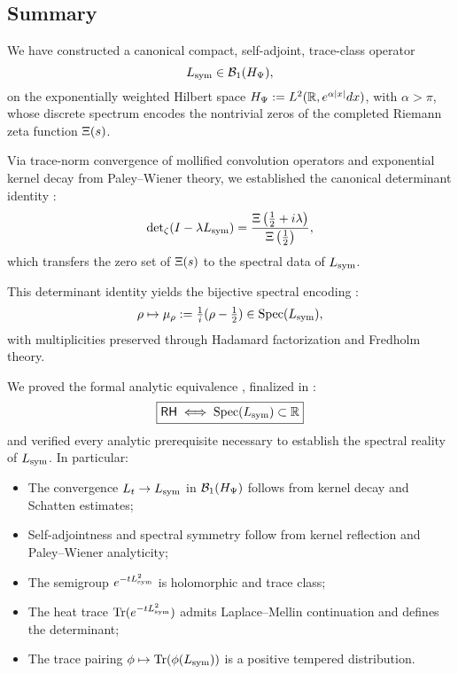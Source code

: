 \subsection*{Summary}

We have constructed a canonical compact, self-adjoint, trace-class operator
\[
L_{\mathrm{sym}} \in \mathcal{B}_1(H_{\Psi}),
\]
on the exponentially weighted Hilbert space \( H_{\Psi} := L^2(\mathbb{R}, e^{\alpha|x|} dx) \), with \( \alpha > \pi \), whose discrete spectrum encodes the nontrivial zeros of the completed Riemann zeta function \( \Xi(s) \).

\medskip

\noindent
Via trace-norm convergence of mollified convolution operators and exponential kernel decay from Paley–Wiener theory, we established the canonical determinant identity :
\[
\det\nolimits_{\zeta}(I - \lambda L_{\mathrm{sym}}) = \frac{\Xi\left(\tfrac{1}{2} + i\lambda\right)}{\Xi\left(\tfrac{1}{2}\right)},
\]
which transfers the zero set of \( \Xi(s) \) to the spectral data of \( L_{\mathrm{sym}} \).

\medskip

\noindent
This determinant identity yields the bijective spectral encoding :
\[
\rho \mapsto \mu_\rho := \tfrac{1}{i}(\rho - \tfrac{1}{2}) \in \operatorname{Spec}(L_{\mathrm{sym}}),
\]
with multiplicities preserved through Hadamard factorization and Fredholm theory.

\medskip

\noindent
We proved the formal analytic equivalence , finalized in :
\[
\boxed{
\mathsf{RH} \iff \operatorname{Spec}(L_{\mathrm{sym}}) \subset \mathbb{R}
}
\]
and verified every analytic prerequisite necessary to establish the spectral reality of \( L_{\mathrm{sym}} \). In particular:
\begin{itemize}
  \item The convergence \( L_t \to L_{\mathrm{sym}} \) in \( \mathcal{B}_1(H_{\Psi}) \) follows from kernel decay and Schatten estimates;
  \item Self-adjointness and spectral symmetry follow from kernel reflection and Paley–Wiener analyticity;
  \item The semigroup \( e^{-t L_{\mathrm{sym}}^2} \) is holomorphic and trace class;
  \item The heat trace \( \operatorname{Tr}(e^{-t L_{\mathrm{sym}}^2}) \) admits Laplace–Mellin continuation and defines the determinant;
  \item The trace pairing \( \phi \mapsto \operatorname{Tr}(\phi(L_{\mathrm{sym}})) \) is a positive tempered distribution.
\end{itemize}

